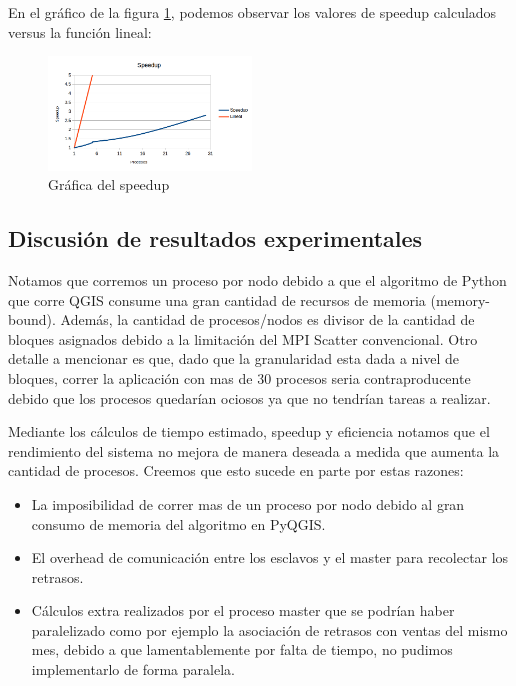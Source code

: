 \documentclass[journal]{IEEEtran}
\begin{document}
En el gráfico de la figura \ref{fig:speedup}, podemos observar los valores de speedup calculados versus la función lineal:

\begin{figure}[h]
    \centering
    \includegraphics[width=0.48\textwidth]{speedup}
    \caption{Gráfica del speedup}
    \label{fig:speedup}
\end{figure}

\subsection{Discusión de resultados experimentales}
Notamos que corremos un proceso por nodo debido a que el algoritmo de Python que corre QGIS consume una gran cantidad de recursos de memoria (memory-bound). Además, la cantidad de procesos/nodos es divisor de la cantidad de bloques asignados debido a la limitación del MPI Scatter convencional. Otro detalle a mencionar es que, dado que la granularidad esta dada a nivel de bloques, correr la aplicación con mas de 30 procesos seria contraproducente debido que los procesos quedarían ociosos ya que no tendrían tareas a realizar.

Mediante los cálculos de tiempo estimado, speedup y eficiencia notamos que el rendimiento del sistema no mejora de manera deseada a medida que aumenta la cantidad de procesos. Creemos que esto sucede en parte por estas razones:
\begin{itemize}
\item La imposibilidad de correr mas de un proceso por nodo debido al gran consumo de memoria del algoritmo en PyQGIS.
\item El overhead de comunicación entre los esclavos y el master para recolectar los retrasos.
\item Cálculos extra realizados por el proceso master que se podrían haber paralelizado como por ejemplo la asociación de retrasos con ventas del mismo mes, debido a que lamentablemente por falta de tiempo, no pudimos implementarlo de forma paralela.
\end{itemize}
\end{document}
